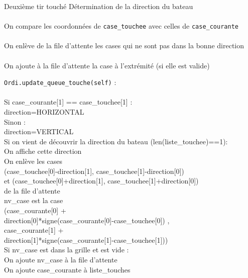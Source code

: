 \begin{frame}{Deuxième tir touché}
Détermination de la direction du bateau\\~\\  \pause
On compare les coordonnées de \texttt{case\_touchee} avec celles de \texttt{case\_courante}\\~\\ \pause
On enlève de la file d'attente les cases qui ne sont pas dans la bonne direction\\~\\ \pause
On ajoute à la file d'attente la case à l'extrémité (si elle est valide)
\end{frame}

{
\begin{frame}[allowframebreaks]
\texttt{Ordi.update\_queue\_touche(self)} :\\~\\

Si case\_courante[1] == case\_touchee[1] :\\
direction=HORIZONTAL\\
Sinon :\\
direction=VERTICAL\\
Si on vient de découvrir la direction du bateau (len(liste\_touchee)==1):\\
On affiche cette direction\\
On enlève les cases \\
 (case\_touchee[0]-direction[1], case\_touchee[1]-direction[0])\\ 
et (case\_touchee[0]+direction[1], case\_touchee[1]+direction[0])\\
de la file d'attente\\
\framebreak
nv\_case est la case\\
(case\_courante[0] +\\
 direction[0]*signe(case\_courante[0]-case\_touchee[0]) ,\\
 case\_courante[1] +\\
 direction[1]*signe(case\_courante[1]-case\_touchee[1]))\\
Si nv\_case est dans la grille et est vide :\\
On ajoute nv\_case à la file d'attente\\
On ajoute case\_courante à liste\_touches\\
\end{frame}
}


